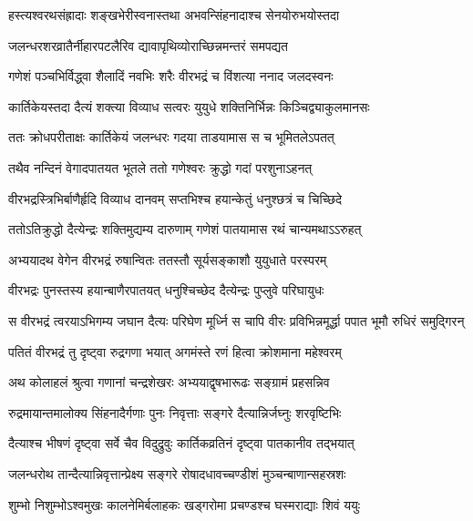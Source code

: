 \twolineshloka
{हस्त्यश्वरथसंह्रादाः शङ्खभेरीस्वनास्तथा}
{अभवन्सिंहनादाश्च सेनयोरुभयोस्तदा} %

\twolineshloka
{जलन्धरशरव्रातैर्नीहारपटलैरिव}
{द्यावापृथिव्योराच्छिन्नमन्तरं समपद्यत} %

\twolineshloka
{गणेशं पञ्चभिर्विद्ध्वा शैलादिं नवभिः शरैः}
{वीरभद्रं च विंशत्या ननाद जलदस्वनः} %

\twolineshloka
{कार्तिकेयस्तदा दैत्यं शक्त्या विव्याध सत्वरः}
{युयुधे शक्तिनिर्भिन्नः किञ्चिद्व्याकुलमानसः} %

\twolineshloka
{ततः क्रोधपरीताक्षः कार्तिकेयं जलन्धरः}
{गदया ताडयामास स च भूमितलेऽपतत्} %

\twolineshloka
{तथैव नन्दिनं वेगादपातयत भूतले}
{ततो गणेश्वरः क्रुद्धो गदां परशुनाऽहनत्} %

\twolineshloka
{वीरभद्रस्त्रिभिर्बाणैर्हृदि विव्याध दानवम्}
{सप्तभिश्च हयान्केतुं धनुश्छत्रं च चिच्छिदे} %

\twolineshloka
{ततोऽतिक्रुद्धो दैत्येन्द्रः शक्तिमुद्यम्य दारुणाम्}
{गणेशं पातयामास रथं चान्यमथाऽऽरुहत्} %

\twolineshloka
{अभ्ययादथ वेगेन वीरभद्रं रुषान्वितः}
{ततस्तौ सूर्यसङ्काशौ युयुधाते परस्परम्} %

\twolineshloka
{वीरभद्रः पुनस्तस्य हयान्बाणैरपातयत्}
{धनुश्चिच्छेद दैत्येन्द्रः पुप्लुवे परिघायुधः} %

\twolineshloka
{स वीरभद्रं त्वरयाऽभिगम्य जघान दैत्यः परिघेण मूर्ध्नि}
{स चापि वीरः प्रविभिन्नमूर्द्धा पपात भूमौ रुधिरं समुद्गिरन्} %





\twolineshloka
{पतितं वीरभद्रं तु दृष्ट्वा रुद्रगणा भयात्}
{अगमंस्ते रणं हित्वा क्रोशमाना महेश्वरम्} %

\twolineshloka
{अथ कोलाहलं श्रुत्वा गणानां चन्द्रशेखरः}
{अभ्ययाद्वृषभारूढः सङ्ग्रामं प्रहसन्निव} %

\twolineshloka
{रुद्रमायान्तमालोक्य सिंहनादैर्गणाः पुनः}
{निवृत्ताः सङ्गरे दैत्यान्निर्जघ्नुः शरवृष्टिभिः} %

\twolineshloka
{दैत्याश्च भीषणं दृष्ट्वा सर्वे चैव विदुद्रुवुः}
{कार्तिकव्रतिनं दृष्ट्वा पातकानीव तद्भयात्} %

\twolineshloka
{जलन्धरोथ तान्दैत्यान्निवृत्तान्प्रेक्ष्य सङ्गरे}
{रोषादधावच्चण्डीशं मुञ्चन्बाणान्सहस्रशः} %

\twolineshloka
{शुम्भो निशुम्भोऽश्वमुखः कालनेमिर्बलाहकः}
{खड्गरोमा प्रचण्डश्च घस्मराद्याः शिवं ययुः} %

